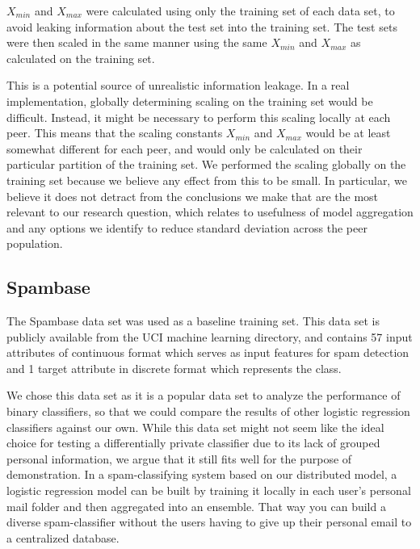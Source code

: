 $X_{min}$ and $X_{max}$ were calculated using only the training set of each data set, to avoid leaking information about the test set into the training set. The test sets were then scaled in the same manner using the same $X_{min}$ and $X_{max}$ as calculated on the training set.

This is a potential source of unrealistic information leakage. In a real implementation, globally determining scaling on the training set would be difficult. Instead, it might be necessary to perform this scaling locally at each peer. This means that the scaling constants $X_{min}$ and $X_{max}$ would be at least somewhat different for each peer, and would only be calculated on their particular partition of the training set. We performed the scaling globally on the training set because we believe any effect from this to be small. In particular, we believe it does not detract from the conclusions we make that are the most relevant to our research question, which relates to usefulness of model aggregation and any options we identify to reduce standard deviation across the peer population.  

\subsection{Spambase} \label{sec:spambase}
The Spambase data set \cite{spambase1999data} was used as a baseline training set. This data set is publicly available from the UCI machine learning directory, and contains 57 input attributes of continuous format which serves as input features for spam detection and 1 target attribute in discrete format which represents the class.

We chose this data set as it is a popular data set to analyze the performance of binary classifiers, so that we could compare the results of other logistic regression classifiers against our own. While this data set might not seem like the ideal choice for testing a differentially private classifier due to its lack of grouped personal information, we argue that it still fits well for the purpose of demonstration. In a spam-classifying system based on our distributed model, a logistic regression model can be built by training it locally in each user's personal mail folder and then aggregated into an ensemble. That way you can build a diverse spam-classifier without the users having to give up their personal email to a centralized database.     

